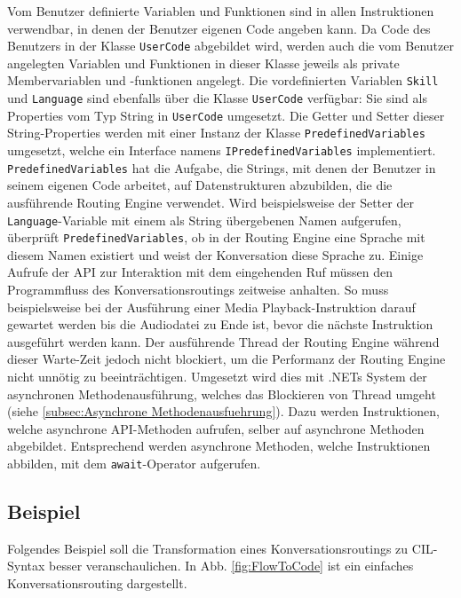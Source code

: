 \newline
Vom Benutzer definierte Variablen und Funktionen sind in allen Instruktionen verwendbar, in denen der Benutzer eigenen Code angeben kann. Da Code des Benutzers in der Klasse \texttt{UserCode} abgebildet wird, werden auch die vom Benutzer angelegten Variablen und Funktionen in dieser Klasse jeweils als private Membervariablen und -funktionen angelegt. Die vordefinierten Variablen \texttt{Skill} und \texttt{Language} sind ebenfalls über die Klasse \texttt{UserCode} verfügbar: Sie sind als Properties vom Typ String in \texttt{UserCode} umgesetzt. Die Getter und Setter dieser String-Properties werden mit einer Instanz der Klasse \texttt{PredefinedVariables} umgesetzt, welche ein Interface namens \texttt{IPredefinedVariables} implementiert. \texttt{PredefinedVariables} hat die Aufgabe, die Strings, mit denen der Benutzer in seinem eigenen Code arbeitet, auf Datenstrukturen abzubilden, die die ausführende Routing Engine verwendet. Wird beispielsweise der Setter der \texttt{Language}-Variable mit einem als String übergebenen Namen aufgerufen, überprüft \texttt{PredefinedVariables}, ob in der Routing Engine eine Sprache mit diesem Namen existiert und weist der Konversation diese Sprache zu. 
\newline
Einige Aufrufe der API zur Interaktion mit dem eingehenden Ruf müssen den Programmfluss des Konversationsroutings zeitweise anhalten. So muss beispielsweise bei der Ausführung einer Media Playback-Instruktion darauf gewartet werden bis die Audiodatei zu Ende ist, bevor die nächste Instruktion ausgeführt werden kann. Der ausführende Thread der Routing Engine während dieser Warte-Zeit jedoch nicht blockiert, um die Performanz der Routing Engine nicht unnötig zu beeinträchtigen. Umgesetzt wird dies mit .NETs System der asynchronen Methodenausführung, welches das Blockieren von Thread umgeht (siehe \ref{subsec:Asynchrone Methodenausfuehrung}). Dazu werden Instruktionen, welche asynchrone API-Methoden aufrufen, selber auf asynchrone Methoden abgebildet. Entsprechend werden asynchrone Methoden, welche Instruktionen abbilden, mit dem \texttt{await}-Operator aufgerufen.

\subsection{Beispiel}
\label{subsec:Beispiel}
Folgendes Beispiel soll die Transformation eines Konversationsroutings zu CIL-Syntax besser veranschaulichen. In Abb. \ref{fig:FlowToCode} ist ein einfaches Konversationsrouting dargestellt. 


